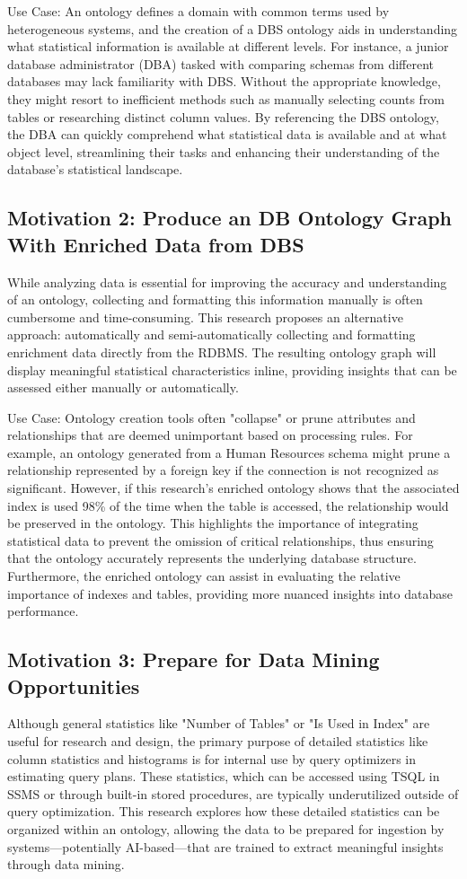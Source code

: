 \documentclass[sigconf]{acmart}
\begin{document}
Use Case: An ontology defines a domain with common terms used by heterogeneous systems, and the creation of a DBS ontology aids in understanding what statistical information is available at different levels. For instance, a junior database administrator (DBA) tasked with comparing schemas from different databases may lack familiarity with DBS. Without the appropriate knowledge, they might resort to inefficient methods such as manually selecting counts from tables or researching distinct column values. By referencing the DBS ontology, the DBA can quickly comprehend what statistical data is available and at what object level, streamlining their tasks and enhancing their understanding of the database’s statistical landscape.

\subsection{Motivation 2: Produce an DB Ontology Graph With Enriched Data from DBS}
While analyzing data is essential for improving the accuracy and understanding of an ontology, collecting and formatting this information manually is often cumbersome and time-consuming. This research proposes an alternative approach: automatically and semi-automatically collecting and formatting enrichment data directly from the RDBMS. The resulting ontology graph will display meaningful statistical characteristics inline, providing insights that can be assessed either manually or automatically.

Use Case:  Ontology creation tools often "collapse" or prune attributes and relationships that are deemed unimportant based on processing rules. For example, an ontology generated from a Human Resources schema might prune a relationship represented by a foreign key if the connection is not recognized as significant. However, if this research's enriched ontology shows that the associated index is used 98\% of the time when the table is accessed, the relationship would be preserved in the ontology. This highlights the importance of integrating statistical data to prevent the omission of critical relationships, thus ensuring that the ontology accurately represents the underlying database structure. Furthermore, the enriched ontology can assist in evaluating the relative importance of indexes and tables, providing more nuanced insights into database performance.

\subsection{Motivation 3: Prepare for Data Mining Opportunities}
Although general statistics like "Number of Tables" or "Is Used in Index" are useful for research and design, the primary purpose of detailed statistics like column statistics and histograms is for internal use by query optimizers in estimating query plans. These statistics, which can be accessed using TSQL in SSMS or through built-in stored procedures, are typically underutilized outside of query optimization. This research explores how these detailed statistics can be organized within an ontology, allowing the data to be prepared for ingestion by systems—potentially AI-based—that are trained to extract meaningful insights through data mining.
\end{document}

